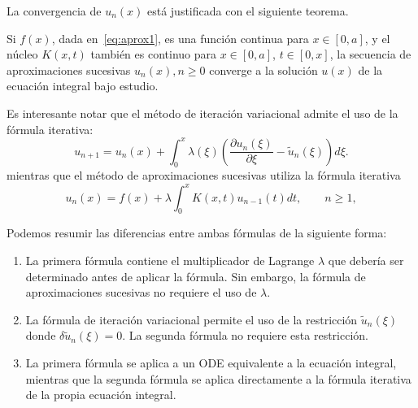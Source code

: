 La convergencia de $u_n(x)$ está justificada con el siguiente teorema.
\begin{teorema}
	Si $f(x)$, dada en~\eqref{eq:aprox1}, es una función continua para $x \in [0,a]$, y el núcleo $K(x,t)$ también es continuo para $x \in [0,a]$, $t \in [0,x]$, la secuencia de aproximaciones sucesivas $u_n(x), n \geqslant 0$ converge a la solución $u(x)$ de la ecuación integral bajo estudio.
\end{teorema}
\begin{observacion}
	Es interesante notar que el método de iteración variacional admite el uso de la fórmula iterativa:
	\begin{equation}
		u_{n+1} = u_n(x) + \int_{0}^{x} \lambda(\xi)(\dfrac{\partial u_n(\xi)}{\partial \xi}-\tilde{u}_n(\xi))d\xi.
	\end{equation}
	mientras que el método de aproximaciones sucesivas utiliza la fórmula iterativa
	\begin{equation}
		u_n(x) = f(x) + \lambda \int_{0}^{x} K(x,t)u_{n-1}(t)dt, \qquad n \geqslant 1,
	\end{equation}
\end{observacion}
Podemos resumir las diferencias entre ambas fórmulas de la siguiente forma:
\begin{enumerate}
	\item La primera fórmula contiene el multiplicador de Lagrange $\lambda$ que debería ser determinado antes de aplicar la fórmula. Sin embargo, la fórmula de aproximaciones sucesivas no requiere el uso de $\lambda$.
	\item La fórmula de iteración variacional permite el uso de la restricción $\tilde{u}_n(\xi)$ donde $\delta \tilde{u}_n(\xi) = 0.$ La segunda fórmula no requiere esta restricción.
	\item La primera fórmula se aplica a un ODE equivalente a la ecuación integral, mientras que la segunda fórmula se aplica directamente a la fórmula iterativa de la propia ecuación integral.
\end{enumerate}

